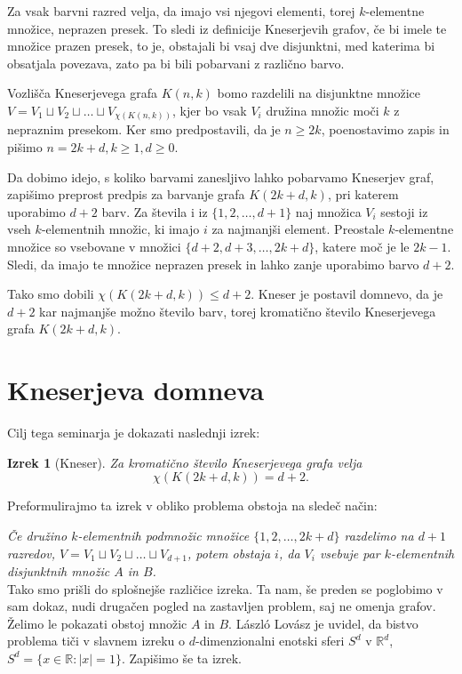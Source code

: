 \documentclass[a4paper,12pt]{article}
\newtheorem{izrek}{Izrek}
\begin{document}
Za vsak barvni razred velja, da imajo vsi njegovi elementi, torej $k$-elementne množice, neprazen presek. To sledi iz definicije Kneserjevih grafov, če bi imele te množice prazen presek, to je, obstajali bi vsaj dve disjunktni, med katerima bi obsatjala povezava, zato pa bi bili pobarvani z različno barvo.

Vozlišča Kneserjevega grafa $K(n,k)$ bomo razdelili na disjunktne množice $V = V_1 \sqcup V_2 \sqcup \ldots \sqcup V_{\chi(K(n,k))}$, kjer bo vsak $V_i$ družina množic moči $k$ z nepraznim presekom. Ker smo predpostavili, da je $n \geq 2k$, poenostavimo zapis in pišimo $n = 2k + d, k \geq 1, d \geq 0$.

Da dobimo idejo, s koliko barvami zanesljivo lahko pobarvamo Kneserjev graf, zapišimo preprost predpis za barvanje grafa $K(2k+d,k)$, pri katerem uporabimo $d+2$ barv. Za števila i iz $\{1,2,\ldots,d+1\}$ naj množica $V_i$ sestoji iz vseh $k$-elementnih množic, ki imajo $i$ za najmanjši element. Preostale $k$-elementne množice so vsebovane v množici $\{d+2,d+3,\ldots,2k+d\}$, katere moč je le $2k-1$. Sledi, da imajo te množice neprazen presek in lahko zanje uporabimo barvo $d+2$. 

Tako smo dobili $\chi(K(2k+d,k)) \leq d+2$. Kneser je postavil domnevo, da je $d+2$ kar najmanjše možno število barv, torej kromatično število Kneserjevega grafa $K(2k+d,k)$.

\section{Kneserjeva domneva}

Cilj tega seminarja je dokazati naslednji izrek:
\begin{izrek}[Kneser]
Za kromatično število Kneserjevega grafa velja
$$\chi(K(2k+d,k)) = d+2.$$
\end{izrek}

\noindent
Preformulirajmo ta izrek v obliko problema obstoja na sledeč način:

\noindent
{\em Če družino $k$-elementnih podmnožic množice $\{1, 2, \ldots, 2k+d\}$ razdelimo na $d+1$ razredov,  $V = V_1 \sqcup V_2 \sqcup \ldots \sqcup V_{d+1}$, potem obstaja $i$, da $V_i$ vsebuje par $k$-elementnih disjunktnih množic $A$ in $B$.} \\

Tako smo prišli do splošnejše različice izreka. Ta nam, še preden se poglobimo v sam dokaz, nudi drugačen pogled na zastavljen problem, saj ne omenja grafov. Želimo le pokazati obstoj množic $A$ in $B$. László Lovász je uvidel, da bistvo problema tiči v slavnem izreku o $d$-dimenzionalni enotski sferi $S^d$ v $\mathbb{R}^d $, $S^d = \{x \in \mathbb{R}: |x|=1\}$. Zapišimo še ta izrek.
\end{document}
